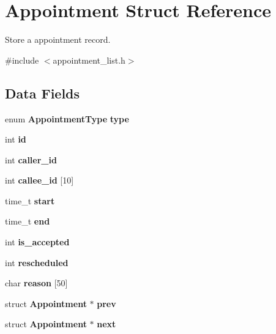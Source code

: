 \section{Appointment Struct Reference}
\label{struct_appointment}


Store a appointment record.  




{\ttfamily \#include $<$appointment\+\_\+list.\+h$>$}

\subsection*{Data Fields}
\begin{DoxyCompactItemize}
\item 
enum {\bf Appointment\+Type} {\bfseries type}\label{struct_appointment_ae7b6c9fdabaf04275e5799e5daf7eecd}

\item 
int {\bfseries id}\label{struct_appointment_a7441ef0865bcb3db9b8064dd7375c1ea}

\item 
int {\bfseries caller\+\_\+id}\label{struct_appointment_a677c4126148ba11b303127cd76cf9e35}

\item 
int {\bfseries callee\+\_\+id} [10]\label{struct_appointment_a1c758224d618992d6bcda246e68384c3}

\item 
time\+\_\+t {\bfseries start}\label{struct_appointment_ada310e7f72b38fadd4b24d80ed3438ee}

\item 
time\+\_\+t {\bfseries end}\label{struct_appointment_a13455ba845bf5d4dba37be491bc6a036}

\item 
int {\bfseries is\+\_\+accepted}\label{struct_appointment_a30449d2de0bda7cca32135a283b0162b}

\item 
int {\bfseries rescheduled}\label{struct_appointment_a7d53dc414f2d787dc031b868da72e703}

\item 
char {\bfseries reason} [50]\label{struct_appointment_a578cf64f7f41b31eeda6f51fdd99b971}

\item 
struct {\bf Appointment} $\ast$ {\bfseries prev}\label{struct_appointment_a76cac42b207c5cf8c9175afad72b7bd2}

\item 
struct {\bf Appointment} $\ast$ {\bfseries next}\label{struct_appointment_a7a0b65c736183dbc90fdeb836add2a10}

\end{DoxyCompactItemize}


